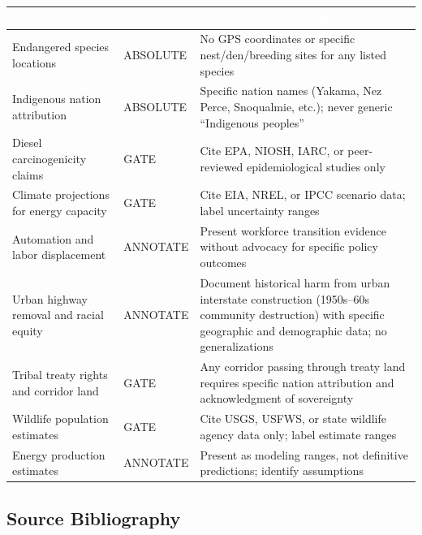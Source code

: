 \documentclass[11pt,letterpaper]{article}
\newcommand{\tableheader}[1]{\textbf{\sffamily\textcolor{white}{#1}}}
\begin{document}
\begin{center}
\begin{tabularx}{\textwidth}{L{4cm}L{2cm}X}
\toprule
{}
\tableheader{Consideration} & \tableheader{Type} & \tableheader{Handling Requirement} \\
\midrule
Endangered species locations & ABSOLUTE & No GPS coordinates or specific nest/den/breeding sites for any listed species \\
Indigenous nation attribution & ABSOLUTE & Specific nation names (Yakama, Nez Perce, Snoqualmie, etc.); never generic ``Indigenous peoples'' \\
Diesel carcinogenicity claims & GATE & Cite EPA, NIOSH, IARC, or peer-reviewed epidemiological studies only \\
Climate projections for energy capacity & GATE & Cite EIA, NREL, or IPCC scenario data; label uncertainty ranges \\
Automation and labor displacement & ANNOTATE & Present workforce transition evidence without advocacy for specific policy outcomes \\
Urban highway removal and racial equity & ANNOTATE & Document historical harm from urban interstate construction (1950s--60s community destruction) with specific geographic and demographic data; no generalizations \\
Tribal treaty rights and corridor land & GATE & Any corridor passing through treaty land requires specific nation attribution and acknowledgment of sovereignty \\
Wildlife population estimates & GATE & Cite USGS, USFWS, or state wildlife agency data only; label estimate ranges \\
Energy production estimates & ANNOTATE & Present as modeling ranges, not definitive predictions; identify assumptions \\
\bottomrule
\end{tabularx}
\end{center}

\subsection{Source Bibliography}
\end{document}
